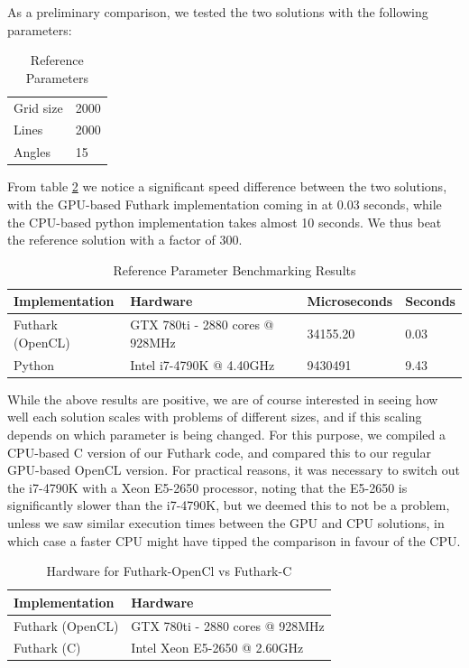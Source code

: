 As a preliminary comparison, we tested the two solutions with the following parameters:
\begin{table}[H]
    \centering
    \label{phantom}
    \begin{tabular}{ll}
        Grid size & 2000 \\
        Lines     & 2000 \\
        Angles    & 15 
    \end{tabular}
    \caption{Reference Parameters}
\end{table}
From table \ref{fig:phantom_results} we notice a significant speed difference between the two solutions, with the GPU-based Futhark implementation coming in at 0.03 seconds, while the CPU-based python implementation takes almost 10 seconds. We thus beat the reference solution with a factor of 300. 
\begin{table}[H]
    \centering
    \begin{tabular}{llll}
        Implementation   & Hardware & Microseconds & Seconds \\
        \hline
        Futhark (OpenCL) & GTX 780ti - 2880 cores @ 928MHz    &34155.20      & 0.03    \\
        Python           & Intel i7-4790K @ 4.40GHz    &9430491      & 9.43     
    \end{tabular}
    \caption{Reference Parameter Benchmarking Results}
    \label{fig:phantom_results}
\end{table}
While the above results are positive, we are of course interested in seeing how well each solution scales with problems of different sizes, and if this scaling depends on which parameter is being changed.
For this purpose, we compiled a CPU-based C version of our Futhark code, and compared this to our regular GPU-based OpenCL version. For practical reasons, it was necessary to switch out the i7-4790K with a Xeon E5-2650 processor, noting that the E5-2650 is significantly slower than the i7-4790K, but we deemed this to not be a problem, unless we saw similar execution times between the GPU and CPU solutions, in which case a faster CPU might have tipped the comparison in favour of the CPU.
\begin{table}[H]
    \centering
    \label{opencl_v_c}
    \begin{tabular}{ll}
        Implementation   & Hardware  \\
        \hline
        Futhark (OpenCL) & GTX 780ti - 2880 cores @ 928MHz      \\
        Futhark (C)      & Intel Xeon E5-2650 @ 2.60GHz     
    \end{tabular}
    \caption{Hardware for Futhark-OpenCl vs Futhark-C}
\end{table}
